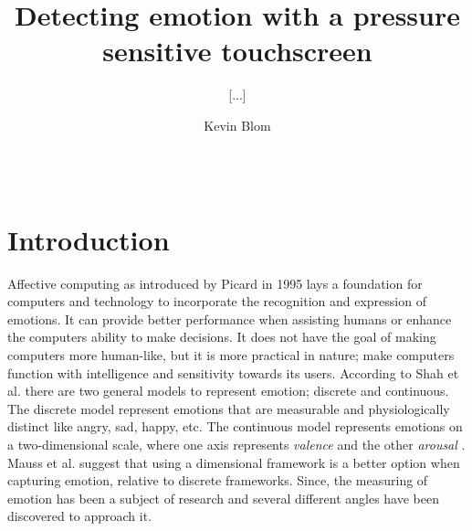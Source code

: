 \documentclass{sig-alternate}
\begin{document}
\title{Detecting emotion with a pressure sensitive touchscreen}
\subtitle{[...]}


%
\author{
%
\alignauthor Kevin Blom\\
       \\
       \\
}

\maketitle

\begin{abstract}
	
\end{abstract}

\section{Introduction} %
\label{sec:introduction}
Affective computing as introduced by Picard\cite{Picard1995} in 1995 lays a foundation for computers and technology to incorporate the recognition and expression of emotions. It can provide better performance when assisting humans or enhance the computers ability to make decisions. It does not have the goal of making computers more human-like, but it is more practical in nature; make computers function with intelligence and sensitivity towards its users\cite{Picard1997}.  According to Shah et al.\cite{Shah2015} there are two general models to represent emotion; discrete and continuous. The discrete model represent emotions that are measurable and physiologically distinct like angry, sad, happy, etc. \cite{Ekman1992} The continuous model represents emotions on a two-dimensional scale, where one axis represents \textit{valence} and the other \textit{arousal} \cite{Posner2005}. Mauss et al. \cite{Mauss2009} suggest that using a dimensional framework is a better option when capturing emotion, relative to discrete frameworks. Since, the measuring of emotion has been a subject of research and several different angles have been discovered to approach it.
\end{document}
